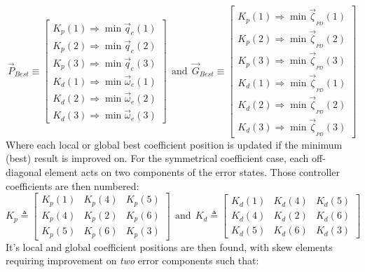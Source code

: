 \begin{equation}
\vec{P}_{Best}\equiv
\begin{bmatrix}
K_p(1)\Rightarrow \min \vec{q}_e(1)\\
K_p(2)\Rightarrow \min \vec{q}_e(2)\\
K_p(3)\Rightarrow \min \vec{q}_e(3)\\
K_d(1)\Rightarrow \min \vec{\omega}_e(1)\\
K_d(2)\Rightarrow \min \vec{\omega}_e(2)\\
K_d(3)\Rightarrow \min \vec{\omega}_e(3)
\end{bmatrix}~~\text{and}~~\vec{G}_{Best}\equiv\begin{bmatrix}
K_p(1)\Rightarrow \min \vec{\zeta}_{_{PD}}(1)\\
K_p(2)\Rightarrow \min \vec{\zeta}_{_{PD}}(2)\\
K_p(3)\Rightarrow \min \vec{\zeta}_{_{PD}}(3)\\
K_d(1)\Rightarrow \min \vec{\zeta}_{_{PD}}(1)\\
K_d(2)\Rightarrow \min \vec{\zeta}_{_{PD}}(2)\\
K_d(3)\Rightarrow \min \vec{\zeta}_{_{PD}}(3)
\end{bmatrix}
\end{equation}
Where each local or global best coefficient position is updated if the minimum (best) result is improved on. For the symmetrical coefficient case, each off-diagonal element acts on two components of the error states. Those controller coefficients are then numbered:
\begin{equation}\label{eq:simulation-attitde-pd-symmetric-coefficients}
K_p\triangleq \begin{bmatrix}
K_p(1) & K_p(4) & K_p(5)\\
K_p(4) & K_p(2) & K_p(6)\\
K_p(5) & K_p(6) & K_p(3)
\end{bmatrix}
~~\text{and}~~K_d\triangleq \begin{bmatrix}
K_d(1) & K_d(4) & K_d(5)\\
K_d(4) & K_d(2) & K_d(6)\\
K_d(5) & K_d(6) & K_d(3)
\end{bmatrix}
\end{equation}
It's local and global coefficient positions are then found, with skew elements requiring improvement on \emph{two} error components such that:
